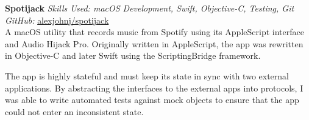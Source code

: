 \textbf{Spotijack}  \newline
\textit{Skills Used: macOS Development, Swift, Objective-C, Testing, Git}\\
\textit{GitHub:} \href{https://github.com/\myweb/spotijack}{alexjohnj/spotijack}\\
A macOS utility that records music from Spotify using its AppleScript interface
and Audio Hijack Pro. Originally written in AppleScript, the app was rewritten
in Objective-C and later Swift using the ScriptingBridge framework.

The app is highly stateful and must keep its state in sync with two external
applications. By abstracting the interfaces to the external apps into protocols,
I was able to write automated tests against mock objects to ensure that the app
could not enter an inconsistent state.

